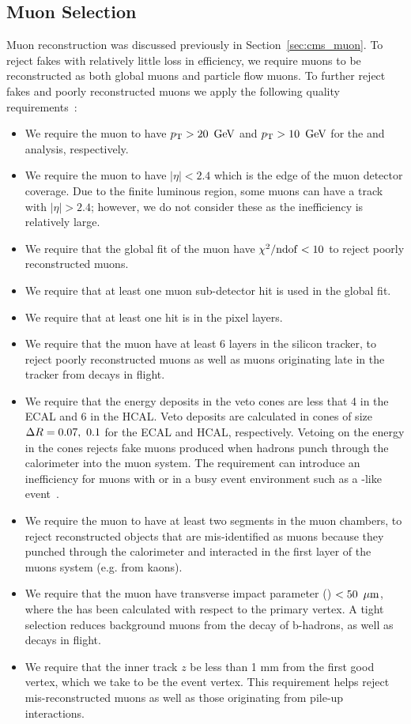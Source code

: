 \subsection{Muon Selection}
\label{sec:evtsel_mu}
Muon reconstruction was discussed previously in Section~\ref{sec:cms_muon}. To reject
fakes with relatively little loss in efficiency, we require muons to be
reconstructed as both global muons and particle flow muons. To further
reject fakes and poorly reconstructed muons we apply the following quality
requirements~\cite{an_ssb2013,muonidtwiki}:
\begin{itemize}
\item We require the muon to have $p_{\mathrm{T}} > 20\ \,\text{Ge\hspace{-.08em}V}$ and $\pt > 10\ \GeV$ for the
\hpt and \lpt analysis, respectively.
\item We require the muon to have $|\eta| < 2.4$ which is the edge of the
muon detector coverage. Due to the finite luminous region, some muons can
have a track with $|\eta| > 2.4$; however, we do not consider these as the
inefficiency is relatively large.
\item We require that the global fit of the muon have $\chi^2/\rm{ndof} < 10$
to reject poorly reconstructed muons.
\item We require that at least one muon sub-detector hit is used in the global
fit.
\item We require that at least one hit is in the pixel layers.
\item We require that the muon have at least 6 layers in the silicon tracker,
to reject poorly reconstructed muons as well as muons originating late in the
tracker from decays in flight.
\item We require that the energy deposits in the veto cones are less that
4 \GeV in the ECAL and 6 \GeV in the HCAL. Veto deposits are calculated in
cones of size $\Delta R = 0.07,\ 0.1$ for the ECAL and HCAL, respectively. Vetoing
on the energy in the cones rejects fake muons produced when hadrons punch
through the calorimeter into the muon system. The requirement can introduce
an inefficiency for muons with \hpt or in a busy event environment such as a
\ttbar-like event~\cite{an_098_2008}.
\item We require the muon to have at least two segments in the muon chambers,
to reject reconstructed objects that are mis-identified as muons because they
punched through the calorimeter and interacted in the first layer of the
muons system (e.g. from kaons).
\item We require that the muon have transverse impact parameter (\dzero) $< 50\
\,\mu\text{m}$, where the \dzero has been calculated with respect to the primary vertex.
A tight selection reduces background muons from the decay of b-hadrons, as well
as decays in flight.
\item We require that the inner track $z$ be less than 1 mm from the first good
vertex, which we take to be the event vertex. This requirement helps reject
mis-reconstructed muons as well as those originating from pile-up interactions.
\end{itemize}
